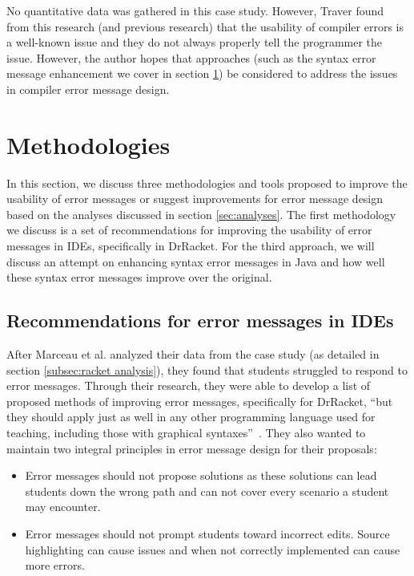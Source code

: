 \documentclass{sig-alternate}
\begin{document}
No quantitative data was gathered in this case study.
However, Traver found from this research (and previous research) that the usability of compiler errors is a well-known issue and they do not always properly tell the programmer the issue.
However, the author hopes that approaches (such as the syntax error message enhancement we cover in section \ref{sec:methodologies}) be considered to address the issues in compiler error message design.


\section{Methodologies}\label{sec:methodologies}
In this section, we discuss three methodologies and tools proposed to improve the usability of error messages or suggest improvements for error message design based on the analyses discussed in section \ref{sec:analyses}.
The first methodology we discuss is a set of recommendations for improving the usability of error messages in IDEs, specifically in DrRacket.
For the third approach, we will discuss an attempt on enhancing syntax error messages in Java and how well these syntax error messages improve over the original. 

\subsection{Recommendations for error messages in IDEs}\label{subsec:error message rubric}
After Marceau et al. analyzed their data from the case study (as detailed in section \ref{subsec:racket analysis}), they found that students struggled to respond to error messages.
Through their research, they were able to develop a list of proposed methods of improving error messages, specifically for DrRacket, ``but they should apply just as well in any other programming language used for teaching, including those with graphical syntaxes''~\cite{Marceau:2011:MYL:2048237.2048241}.
They also wanted to maintain two integral principles in error message design for their proposals:

\begin{itemize}
	\item Error messages should not propose solutions as these solutions can lead students down the wrong path and can not cover every scenario a student may encounter.
	\item Error messages should not prompt students toward incorrect edits. Source highlighting can cause issues and when not correctly implemented can cause more errors.
\end{itemize}
\end{document}
